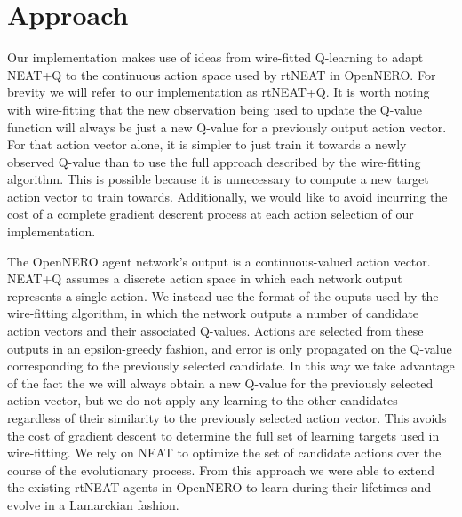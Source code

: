 \documentclass[letterpaper]{article}
\begin{document}
\section{Approach}
Our implementation makes use of ideas from wire-fitted Q-learning to adapt NEAT+Q to the continuous action space used by rtNEAT in OpenNERO. For brevity we will refer to our implementation as rtNEAT+Q. It is worth noting with wire-fitting that the new observation being used to update the Q-value function will always be just a new Q-value for a previously output action vector. For that action vector alone, it is simpler to just train it towards a newly observed Q-value than to use the full approach described by the wire-fitting algorithm. This is possible because it is unnecessary to compute a new target action vector to train towards. Additionally, we would like to avoid incurring the cost of a complete gradient descrent process at each action selection of our implementation.

The OpenNERO agent network's output is a continuous-valued action vector. NEAT+Q assumes a discrete action space in which each network output represents a single action. We instead use the format of the ouputs used by the wire-fitting algorithm, in which the network outputs a number of candidate action vectors and their associated Q-values. Actions are selected from these outputs in an epsilon-greedy fashion, and error is only propagated on the Q-value corresponding to the previously selected candidate. In this way we take advantage of the fact the we will always obtain a new Q-value for the previously selected action vector, but we do not apply any learning to the other candidates regardless of their similarity to the previously selected action vector. This avoids the cost of gradient descent to determine the full set of learning targets used in wire-fitting. We rely on NEAT to optimize the set of candidate actions over the course of the evolutionary process. From this approach we were able to extend the existing rtNEAT agents in OpenNERO to learn during their lifetimes and evolve in a Lamarckian fashion.
\end{document}
